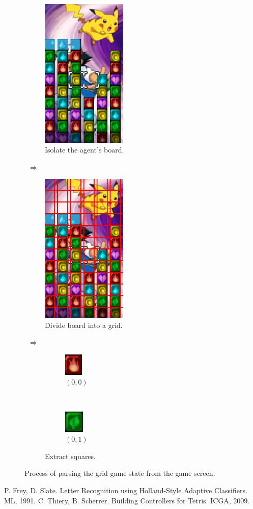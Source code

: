 \documentclass[10pt, final]{article}
\begin{document}
\begin{figure}[h!]\begin{center}
\begin{subfigure}[h]{1.6in}
\includegraphics[width=1.6in]{board.jpg}
\caption*{Isolate the agent's board.}
\end{subfigure}
~$\mathbf{\Longrightarrow}$~
\begin{subfigure}[h]{1.6in}
\includegraphics[width=1.6in]{grid.jpg}
\caption*{Divide board into a grid.}
\end{subfigure}
~$\mathbf{\Longrightarrow}$~
\begin{subfigure}[h]{1.2in}
  \begin{subfigure}[h]{.5in}
  \includegraphics[]{square0.jpg}
  \caption*{$(0,0)$}
  \end{subfigure}
  ~
  \begin{subfigure}[h]{.5in}
  \includegraphics[]{square1.jpg}
  \caption*{$(0,1)$}
  \end{subfigure}
  \caption*{Extract squares.}
\end{subfigure}
\caption{Process of parsing the grid game state from the game screen.}
\label{fig:extract}
\end{center}\end{figure}

\begin{thebibliography}{1}
 P. Frey, D. Slate. Letter Recognition using Holland-Style Adaptive Classifiers. ML, 1991.
 C. Thiery, B. Scherrer. Building Controllers for Tetris. ICGA, 2009.
\end{thebibliography}
\end{document}
